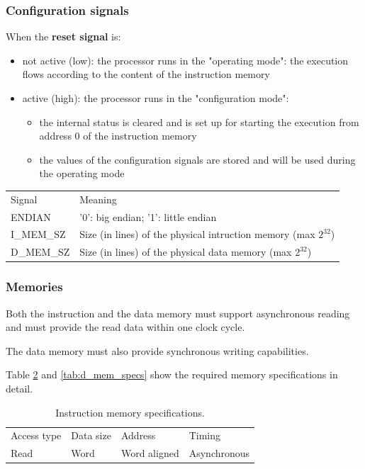 \subsubsection{Configuration signals}
When the \textbf{reset signal} is:
\begin{itemize}
	\item not active (low): the processor runs in the "operating mode":
		the execution flows according to the content of the instruction
		memory
	\item active (high): the processor runs in the "configuration mode":
		\begin{itemize}
			\item the internal status is cleared and is set up for
				starting the execution from address 0 of the
				instruction memory
			\item the values of the configuration signals are stored
				and will be used during the operating mode
		\end{itemize}
\end{itemize}

\begin{table}[ht]
	\centering
	\begin{tabular}{ll}
		\hline
		\rowcolor{gray!50}
		Signal & Meaning \\
		ENDIAN & '0': big endian; '1': little endian \\
		\rowcolor{gray!25}
		I\_MEM\_SZ & Size (in lines) of the physical intruction memory 
			(max $2^{32}$) \\
		D\_MEM\_SZ & Size (in lines) of the physical data memory 
			(max $2^{32}$) \\
		\hline
	\end{tabular}
	\label{tab:config_signals}
\end{table}

\subsubsection{Memories}
Both the instruction and the data memory must support asynchronous reading and
must provide the read data within one clock cycle.

The data memory must also provide synchronous writing capabilities.

\bigskip
Table \ref{tab:i_mem_specs} and \ref{tab:d_mem_specs} show the required memory
specifications in detail.

\begin{table}[ht]
	\centering
	\begin{tabular}{llll}
		\hline
		\rowcolor{gray!50}
		Access type & Data size & Address & Timing \\
		Read & Word & Word aligned & Asynchronous \\
		\hline
	\end{tabular}
	\caption{Instruction memory specifications.}
	\label{tab:i_mem_specs}
\end{table}

